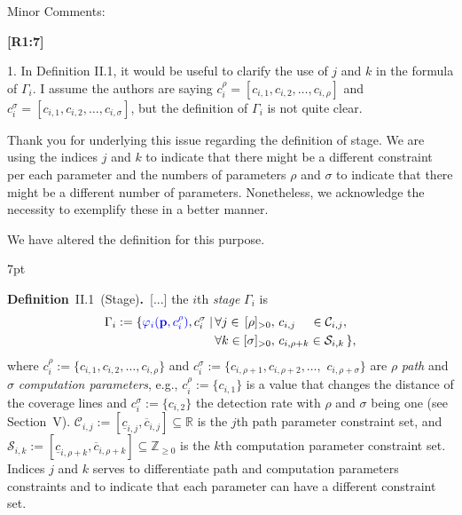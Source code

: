\documentclass[10pt]{letter}
\newenvironment{formal}{%
  \def\FrameCommand{%
    \hspace{1pt}%
    {\color{red}\vrule width 2pt}%
    {\color{formalshade}\vrule width 4pt}%
    \colorbox{formalshade}%
  }%
  \MakeFramed{\advance\hsize-\width\FrameRestore}%
  \noindent\hspace{-4.55pt}%
  \begin{adjustwidth}{}{7pt}%
  \vspace{2pt}\vspace{2pt}%
}
{%
  \vspace{2pt}\end{adjustwidth}\endMakeFramed%
}
\begin{document}
\vspace{2em}


Minor Comments:

{\hspace*{-4.5em}\textbf{[R1:7]}\vspace*{-1.9em}}

1. In Definition II.1, it would be useful to clarify the use of $j$ and $k$ in the formula of $\Gamma_i$. I assume the authors are saying $c^\rho_i=[c_{i,1},c_{i,2},\dots,c_{i,\rho}]$ and $c^\sigma_i=[c_{i,1},c_{i,2},\dots,c_{i,\sigma}]$, but the definition of $\Gamma_i$ is not quite clear.

{\color{blue} 

{\hspace*{-4.5em}{[R1:7]}\vspace*{-1.9em}}

Thank you for underlying this issue regarding the definition of stage. We are using the indices $j$ and $k$ to indicate that there might be a different constraint per each parameter and the numbers of parameters $\rho$ and $\sigma$ to indicate that there might be a different number of parameters. Nonetheless, we acknowledge the necessity to exemplify these in a better manner.

We have altered the definition for this purpose.

\begin{formal}
  \color{black} 
  \textbf{Definition}~II.1~(Stage)\textbf{.}~[...] the $i$th \emph{stage} $\Gamma_i$ %
    is
  \begin{equation*}\begin{split}
      \Gamma_i:=\{{\color{blue}\varphi_i(\mathbf{p}%
      ,c_i^\rho)},c_i^\sigma\mid
      \,&\forall j\in\,[\rho]_{>0},\,c_{i,j}\,\,\,\,\,\,\,\in\mathcal{C}_{i,j},\,\\
        &\forall k\in[\sigma]_{>0},\,c_{i,\rho+k}\in\mathcal{S}_{i,k}\,\},
  \end{split}\end{equation*}
  where $c_i^\rho${\color{blue}$:=\{c_{i,1},c_{i,2},\dots,c_{i,\rho}\}$} and $c_i^\sigma${\color{blue}$:=\{c_{i,\rho+1},c_{i,\rho+2},\dots,$ $c_{i,\rho+\sigma}\}$} are $\rho$ \emph{path} and $\sigma$ \emph{computation parameters}{\color{blue}, e.g., $c_i^\rho:=\{c_{i,1}\}$ is a value that changes the distance of the coverage lines and $c^\sigma_i:=\{c_{i,2}\}$ the detection rate with $\rho$ and $\sigma$ being one (see Section~{\color{red}V})}. $\mathcal{C}_{i,j}:=[\underline{c}_{i,j},\overline{c}_{i,j}]\subseteq\mathbb{R}$ is the $j$th path parameter %
  constraint set, and $\mathcal{S}_{i,k}:=[\underline{c}_{i,\rho+k},\overline{c}_{i,\rho+k}]\subseteq\mathbb{Z}_{\geq 0}$ is the $k$th computation parameter constraint set. {\color{blue}Indices $j$ and $k$ serves to differentiate path and computation parameters constraints and to indicate that each parameter can have a different constraint set.}
  \vspace*{1ex}
\end{formal}

}
\end{document}

